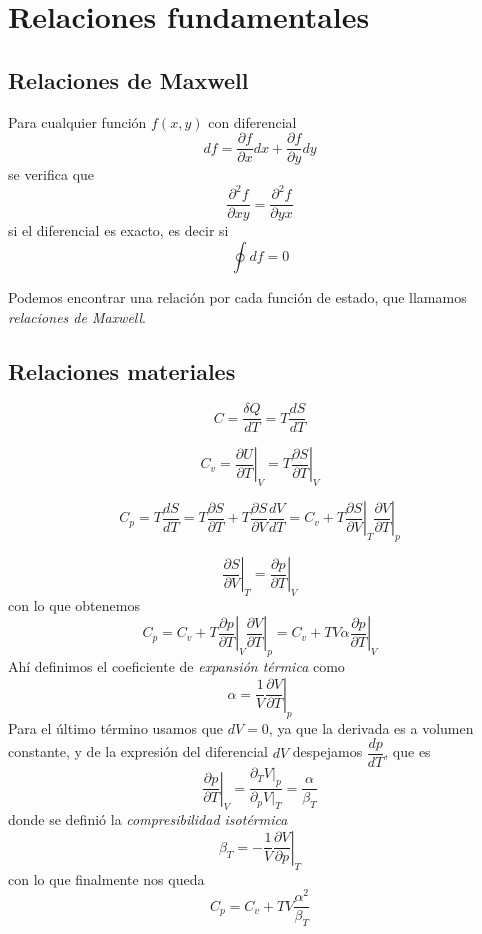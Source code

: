 \documentclass{book}
\numberwithin{equation}{section} %
\begin{document}
\section{Relaciones fundamentales}

\subsection{Relaciones de Maxwell}
Para cualquier función $f(x,y)$ con diferencial
\[df = \frac{\partial f}{\partial x} dx + \frac{\partial f}{\partial y} dy\]
se verifica que 
\[\frac{\partial^2 f}{\partial x y} = \frac{\partial^2 f}{\partial y x}\]
si el diferencial es exacto, es decir si
\[\oint df = 0\]

Podemos encontrar una relación por cada función de estado, que llamamos \emph{relaciones de Maxwell}.

\subsection{Relaciones materiales}

\begin{equation}
C = \frac{\delta Q}{d T} = T \frac{dS}{dT}
\end{equation}

\begin{equation}
C_v = \left.\frac{\partial U}{\partial T}\right|_V = T \left.\frac{\partial S}{\partial T}\right|_V
\label{eq:cv}
\end{equation}

\[C_p = T \frac{dS}{dT} = T \frac{\partial S}{\partial T} + T \frac{\partial S}{\partial V} \frac{dV}{dT} = C_v + T \left.\frac{\partial S}{\partial V}\right|_T \left.\frac{\partial V}{\partial T}\right|_p\]

\[\left.\frac{\partial S}{\partial V}\right|_T = \left.\frac{\partial p}{\partial T}\right|_V\]
con lo que obtenemos
\[C_p = C_v + T \left.\frac{\partial p}{\partial T}\right|_V \left.\frac{\partial V}{\partial T}\right|_p = C_v + T V \alpha \left.\frac{\partial p}{\partial T}\right|_V\]
Ahí definimos el coeficiente de \emph{expansión térmica} como
\begin{equation}
\alpha = \frac{1}{V} \left.\frac{\partial V}{\partial T}\right|_p
\end{equation}
Para el último término usamos que $dV = 0$, ya que la derivada es a volumen constante, y de la expresión del diferencial $dV$ despejamos $\dfrac{dp}{dT}$, que es
\[ \left.\frac{\partial p}{\partial T}\right|_V = \frac{\partial_T V |_p}{\partial_p V|_T} = \frac{\alpha}{\beta_T}\]
donde se definió la \emph{compresibilidad isotérmica}
\begin{equation}
\beta_T = - \frac{1}{V} \left.\frac{\partial V}{\partial p}\right|_T
\end{equation}
con lo que finalmente nos queda
\begin{equation}
C_p = C_v + T V \frac{\alpha^2}{\beta_T}
\end{equation}
\end{document}
